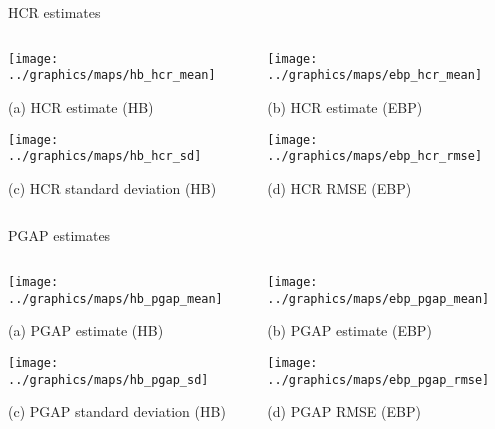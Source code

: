 \begin{frame}{HCR estimates}

    \begin{columns}
        \begin{column}{0.49\textwidth}
            \centering

            \texttt{[image: ../graphics/maps/hb\_hcr\_mean]}

            \scriptsize{(a) HCR estimate (HB)}

            \texttt{[image: ../graphics/maps/hb\_hcr\_sd]}

            \scriptsize{(c) HCR standard deviation (HB)}

        \end{column}



        \begin{column}{0.49\textwidth}
            \centering
            \texttt{[image: ../graphics/maps/ebp\_hcr\_mean]}

            \scriptsize{(b) HCR estimate (EBP)}

            \texttt{[image: ../graphics/maps/ebp\_hcr\_rmse]}

            \scriptsize{(d) HCR RMSE (EBP)}
        \end{column}
    \end{columns}
\end{frame}

\begin{frame}{PGAP estimates}

    \begin{columns}
        \begin{column}{0.49\textwidth}
            \centering

            \texttt{[image: ../graphics/maps/hb\_pgap\_mean]}

            \scriptsize{(a) PGAP estimate (HB)}

            \texttt{[image: ../graphics/maps/hb\_pgap\_sd]}

            \scriptsize{(c) PGAP standard deviation (HB)}

        \end{column}



        \begin{column}{0.49\textwidth}
            \centering
            \texttt{[image: ../graphics/maps/ebp\_pgap\_mean]}

            \scriptsize{(b) PGAP estimate (EBP)}

            \texttt{[image: ../graphics/maps/ebp\_pgap\_rmse]}

            \scriptsize{(d) PGAP RMSE (EBP)}
        \end{column}
    \end{columns}
\end{frame}

